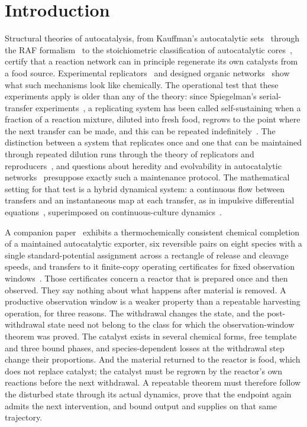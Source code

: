 \documentclass[11pt,a4paper]{article}
\theoremstyle{plain}
\theoremstyle{definition}
\theoremstyle{remark}
\begin{document}
\section{Introduction}\label{sec:intro}

Structural theories of autocatalysis, from Kauffman's autocatalytic sets~\citep{kauffman1986} through the RAF formalism~\citep{hordijk2004,steel2019} to the stoichiometric classification of autocatalytic cores~\citep{blokhuis2020}, certify that a reaction network can in principle regenerate its own catalysts from a food source. Experimental replicators~\citep{vonkiedrowski1986,lincoln2009,vaidya2012,ameta2021} and designed organic networks~\citep{semenov2016} show what such mechanisms look like chemically. The operational test that these experiments apply is older than any of the theory: since Spiegelman's serial-transfer experiments~\citep{mills1967}, a replicating system has been called self-sustaining when a fraction of a reaction mixture, diluted into fresh food, regrows to the point where the next transfer can be made, and this can be repeated indefinitely~\citep{lincoln2009}. The distinction between a system that replicates once and one that can be maintained through repeated dilution runs through the theory of replicators and reproducers~\citep{eigen1971,szathmary2006}, and questions about heredity and evolvability in autocatalytic networks~\citep{vasas2010} presuppose exactly such a maintenance protocol. The mathematical setting for that test is a hybrid dynamical system: a continuous flow between transfers and an instantaneous map at each transfer, as in impulsive differential equations~\citep{lakshmikantham1989}, superimposed on continuous-culture dynamics~\citep{smithwaltman1995}.

A companion paper~\citep{thermo2026} exhibits a thermochemically consistent chemical completion of a maintained autocatalytic exporter, six reversible pairs on eight species with a single standard-potential assignment across a rectangle of release and cleavage speeds, and transfers to it finite-copy operating certificates for fixed observation windows~\citep{exporter2026,finitecopy2026}. Those certificates concern a reactor that is prepared once and then observed. They say nothing about what happens after material is removed. A productive observation window is a weaker property than a repeatable harvesting operation, for three reasons. The withdrawal changes the state, and the post-withdrawal state need not belong to the class for which the observation-window theorem was proved. The catalyst exists in several chemical forms, free template and three bound phases, and species-dependent losses at the withdrawal step change their proportions. And the material returned to the reactor is food, which does not replace catalyst; the catalyst must be regrown by the reactor's own reactions before the next withdrawal. A repeatable theorem must therefore follow the disturbed state through its actual dynamics, prove that the endpoint again admits the next intervention, and bound output and supplies on that same trajectory.
\end{document}
